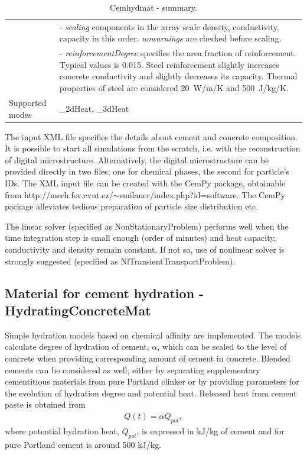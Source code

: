 \documentclass[a4paper]{article}
\newcommand{\param}[1]{{\it #1}}
\begin{document}
\begin{table}[!htb]
\begin{tabular}{|l|p{9cm}|}
&- \param{scaling} components in the array scale density, conductivity, capacity in this order. \param{nowarnings} are checked before scaling.\\
&- \param{reinforcementDegree} specifies the area fraction of reinforcement. Typical values is 0.015. Steel reinforcement slightly increases concrete conductivity and slightly decreases its capacity. Thermal properties of steel are considered 20~W/m/K and 500~J/kg/K.\\
Supported modes& \_2dHeat, \_3dHeat\\
\hline
\end{tabular}
\caption{Cemhydmat - summary.}
\label{Cemhydmat_table}
\end{table}

The input XML file specifies the details about cement and concrete composition.
It is possible to start all simulations from the scratch, i.e. with the
reconstruction of digital microstructure. Alternatively, the digital
microstructure can be provided directly in two files; one for chemical phases,
the second for particle's IDs. The XML input file can be created with the CemPy
package, obtainable from
http://mech.fsv.cvut.cz/$\sim$smilauer/index.php?id=software. The CemPy package
alleviates tedious preparation of particle size distribution etc.

The linear solver (specified as NonStationaryProblem) performs well when the
time integration step is small enough (order of minutes) and heat capacity,
conductivity and density remain constant. If not so, use of nonlinear solver is
strongly suggested (specified as NlTransientTransportProblem).

\clearpage

\subsection{Material for cement hydration - HydratingConcreteMat}
\label{Affinity1}
Simple hydration models based on chemical affinity are implemented. The models calculate degree of hydration of cement, $\alpha$, which can be scaled to the level of concrete when providing corresponding amount of cement in concrete. Blended cements can be considered as well, either by separating supplementary cementitious materials from pure Portland clinker or by providing parameters for the evolution of hydration degree and potential heat. Released heat from cement paste is obtained from
\begin{eqnarray}
Q(t) = \alpha Q_{pot},
\end{eqnarray}
where potential hydration heat, $Q_{pot}$, is expressed in kJ/kg of cement and for pure Portland cement is around 500 kJ/kg.
\end{document}
